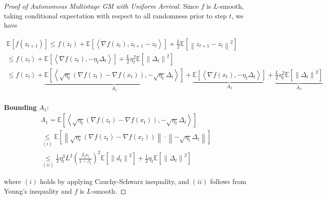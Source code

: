 \begin{proof}[Proof of Autonomous Multistage GM with Uniform Arrival]
Since $f$ is $L$-smooth, taking conditional expectation with respect to all randomness prior to step $t$, we have

\begin{equation}
\begin{gathered}
\mathbb{E}\left[f(z_{t+1})\right]\leq
f(z_t)+\mathbb{E}\left[\left\langle \nabla f(z_t),z_{t+1}-z_t \right\rangle\right]+\frac{L}{2}\mathbb{E}\left[\left\| z_{t+1}-z_t\right\|^2\right]\\
\leq f(z_t)+\mathbb{E}\left[\left\langle \nabla f(z_t),-\eta_t  \Delta_t \right\rangle\right]+\frac{L}{2}\eta_t^2\mathbb{E}\left[\left\| \Delta_t\right\|^2\right]\\
\leq f(z_t)+ \underbrace{\mathbb{E}\left[\left\langle \sqrt{\eta_t} \left(\nabla f(z_t)-\nabla f(x_t)\right),-\sqrt{\eta_t } \Delta_t \right\rangle\right]}_{A_1} + \underbrace{\mathbb{E}\left[\left\langle \nabla f(x_t),-\eta_t \Delta_t \right\rangle\right]}_{A_2} + \underbrace{\frac{L}{2}\eta_t^2\mathbb{E}\left[\left\| \Delta_t\right\|^2\right]}_{A_3} \\
\end{gathered}\nonumber
\end{equation}

 

\textbf{Bounding} $A_1$:
\begin{equation}
\begin{gathered}
A_1 =\mathbb{E}\left[\left\langle \sqrt{\eta_t} \left(\nabla f(z_t)-\nabla f(x_t)\right),-\sqrt{\eta_t} \Delta_t \right\rangle\right]\\
\underset{(i)}{\leq}\mathbb{E}\left[\left\|\sqrt{\eta_t} \left(\nabla f(z_t)-\nabla f(x_t)\right)\right\| \cdot \left\|-\sqrt{\eta_t} \Delta_t\right\|\right]\\
\underset{(ii)}{\leq}\frac{1}{2}\eta_t^3 L^2\left(\frac{\beta_t\nu_t}{1-\beta_t}\right)^2\mathbb{E}\left[\left\| d_t\right\|^2\right] + \frac{1}{2}\eta_t\mathbb{E}\left[\left\|\Delta_t\right\|^2\right]
\end{gathered}\nonumber
\end{equation}

where $(i)$ holds by applying Cauchy-Schwarz inequality, and $(ii)$ follows from Young’s inequality and $f$ is $L$-smooth.

 


\end{proof}
